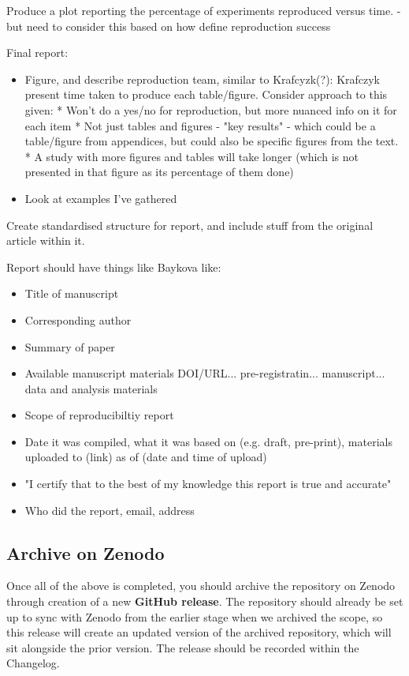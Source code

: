 Produce a plot reporting the percentage of experiments reproduced versus time. - but need to consider this based on how define reproduction success

Final report:
\begin{itemize}
    \item Figure, and describe reproduction team, similar to Krafcyzk(?):\autocite{krafczyk_learning_2021} Krafczyk present time taken to produce each table/figure. Consider approach to this given: * Won't do a yes/no for reproduction, but more nuanced info on it for each item * Not just tables and figures - "key results" - which could be a table/figure from appendices, but could also be specific figures from the text. * A study with more figures and tables will take longer (which is not presented in that figure as its percentage of them done)
    \item Look at examples I've gathered
\end{itemize}

Create standardised structure for report, and include stuff from the original article within it.

Report should have things like Baykova \autocite{baykova_ensuring_2024} like:
\begin{itemize}
    \item Title of manuscript
    \item Corresponding author
    \item Summary of paper
    \item Available manuscript materials DOI/URL... pre-registratin... manuscript... data and analysis materials
    \item Scope of reproducibiltiy report
    \item Date it was compiled, what it was based on (e.g. draft, pre-print), materials uploaded to (link) as of (date and time of upload)
    \item "I certify that to the best of my knowledge this report is true and accurate"
    \item Who did the report, email, address
\end{itemize}

\subsection{Archive on Zenodo}

Once all of the above is completed, you should archive the repository on Zenodo through creation of a new \textbf{GitHub release}. The repository should already be set up to sync with Zenodo from the earlier stage when we archived the scope, so this release will create an updated version of the archived repository, which will sit alongside the prior version. The release should be recorded within the Changelog.

